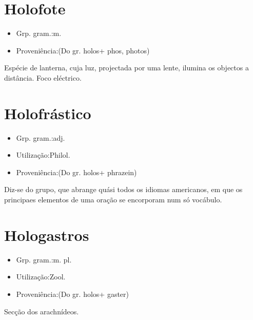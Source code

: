 \documentclass{article}
\begin{document}
\section{Holofote}
\begin{itemize}
\item {Grp. gram.:m.}
\end{itemize}
\begin{itemize}
\item {Proveniência:(Do gr. \textunderscore holos\textunderscore  + \textunderscore phos\textunderscore , \textunderscore photos\textunderscore )}
\end{itemize}
Espécie de lanterna, cuja luz, projectada por uma lente, ilumina os objectos a distância.
Foco eléctrico.
\section{Holofrástico}
\begin{itemize}
\item {Grp. gram.:adj.}
\end{itemize}
\begin{itemize}
\item {Utilização:Philol.}
\end{itemize}
\begin{itemize}
\item {Proveniência:(Do gr. \textunderscore holos\textunderscore  + \textunderscore phrazein\textunderscore )}
\end{itemize}
Diz-se do grupo, que abrange quási todos os idiomas americanos, em que os principaes elementos de uma oração se encorporam num só vocábulo.
\section{Hologastros}
\begin{itemize}
\item {Grp. gram.:m. pl.}
\end{itemize}
\begin{itemize}
\item {Utilização:Zool.}
\end{itemize}
\begin{itemize}
\item {Proveniência:(Do gr. \textunderscore holos\textunderscore  + \textunderscore gaster\textunderscore )}
\end{itemize}
Secção dos arachnídeos.
\end{document}

